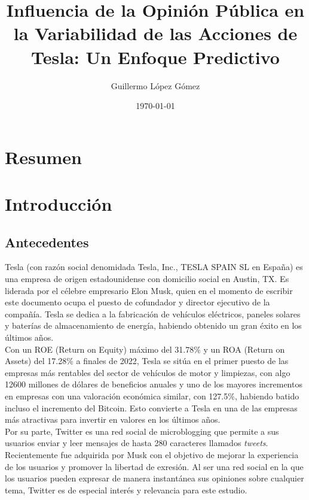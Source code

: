 \documentclass[a4paper, 12pt]{report}
\title{Influencia de la Opinión Pública en la Variabilidad de las Acciones de Tesla: Un Enfoque Predictivo}
\author{Guillermo López Gómez}
\date{\today}
\begin{document}
\maketitle

\tableofcontents
    \chapter{Resumen}
    \chapter{Introducción}
        \section{Antecedentes}
                Tesla (con razón social denomidada Tesla, Inc., TESLA SPAIN SL en España) es una empresa de origen estadounidense con domicilio social en Austin, TX.
                Es liderada por el célebre empresario Elon Musk, quien en el momento de escribir este documento ocupa el puesto de cofundador y director ejecutivo de la compañía.
                Tesla se dedica a la fabricación de vehículos eléctricos, paneles solares y baterías de almacenamiento de energía, habiendo obtenido un gran éxito en los últimos años.\\

                Con un ROE (Return on Equity) máximo del 31.78\%
                y un ROA (Return on Assets) del 17.28\%  a finales de 2022, Tesla se sitúa en el primer puesto de las empresas más rentables del sector 
                de vehículos de motor  y limpiezas, con algo 12600 millones de dólares 
                de beneficios anuales y uno de los mayores incrementos en empresas con una valoración económica similar, con 127.5\%, habiendo batido incluso 
                el incremento del Bitcoin. Esto convierte a Tesla
                en una de las empresas más atractivas para invertir en valores en los últimos años.\\

                Por su parte, Twitter es una red social de microblogging que permite a sus usuarios enviar y leer mensajes de hasta 280 caracteres llamados \textit{tweets}.
                Recientemente fue adquirida por Musk con el objetivo de mejorar la experiencia de los usuarios y promover la libertad de exresión. 
                Al ser una red social en la que los usuarios pueden expresar de manera instantánea sus opiniones sobre cualquier tema, Twitter es de especial interés y relevancia para este estudio.
\end{document}
